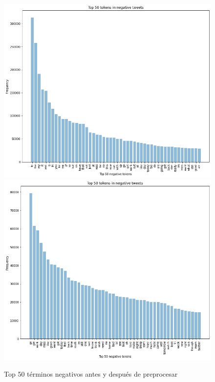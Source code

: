 \documentclass[a4paper,12pt]{report}
\begin{document}
\begin{figure}[htbp!]
\begin{center}
\includegraphics[scale=0.3]{images/neg.png}
\includegraphics[scale=0.3]{images/neg_clean.png}
\end{center}
\caption{Top 50 términos negativos antes y después de preprocesar}
\end{figure}
\end{document}
